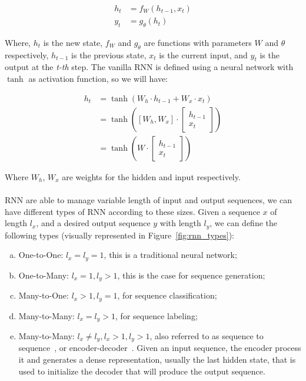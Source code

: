 \begin{equation}
\begin{split}
    h_t & = f_W(h_{t-1}, x_t) \\
    y_t & = g_{\theta}(h_t)
\end{split}
\label{eq:generic_rnn}
\end{equation}

Where, $h_t$ is the new state, $f_W$ and $g_\theta$ are functions with parameters $W$ and $\theta$ respectively, $h_{t-1}$ is the previous state, $x_t$ is the current input, and $y_t$ is the output at the \textit{t-th} step.
The vanilla RNN is defined using a neural network with $\tanh$ as activation function, so we will have:

\begin{equation}
\begin{split}
    h_t & = \tanh\left(W_h \cdot h_{t-1} + W_x \cdot x_t\right)\\
        & = \tanh\left([W_h, W_x] \cdot \begin{bmatrix}
           h_{t-1} \\
           x_t
         \end{bmatrix}\right)\\
         & = \tanh\left(W \cdot \begin{bmatrix}
           h_{t-1} \\
           x_t
         \end{bmatrix}\right)
\end{split}
\end{equation}

Where $W_h$, $W_x$ are weights for the hidden and input respectively. 

\paragraph{}
RNN are able to manage variable length of input and output sequences, we can have different types of RNN according to these sizes. Given a sequence $x$ of length $l_x$, and a desired output sequence $y$ with length $l_y$, we can define the following types (visually represented in Figure~\ref{fig:rnn_types}):

\begin{enumerate}[a), noitemsep]
    \item One-to-One: $l_x = l_y = 1$, this is a traditional neural network;
    \item One-to-Many: $l_x = 1, l_y > 1$, this is the case for sequence generation;
    \item Many-to-One: $l_x > 1, l_y = 1$, for sequence classification;
    \item Many-to-Many: $l_x = l_y > 1$, for sequence labeling;
    \item Many-to-Many: $l_x \neq l_y, l_x > 1, l_y > 1$, also referred to as sequence to sequence~\citep{sutskever2014sequence}, or encoder-decoder~\citep{cho-etal-2014-learning}. Given an input sequence, the encoder process it and generates a dense representation, usually the last hidden state, that is used to initialize the decoder that will produce the output sequence.
\end{enumerate}

